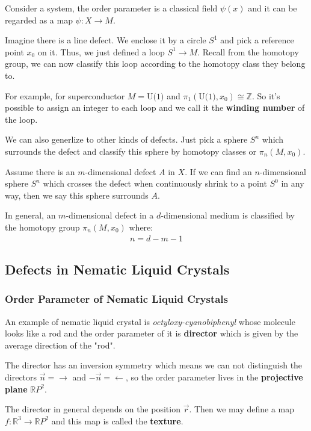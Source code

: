 \documentclass[10pt]{article}
\begin{document}
Consider a system, the order parameter is a classical field $\psi(x)$ and it can be regarded as a map $\psi:X\to M$.

Imagine there is a line defect.
We enclose it by a circle $S^1$ and pick a reference point $x_0$ on it.
Thus, we just defined a loop $S^1\to M$.
Recall from the homotopy group, we can now classify this loop according to the homotopy class they belong to.

For example, for superconductor $M=\text{U(1)}$ and $\pi_1\left(\text{U(1)},x_0\right)\cong\mathbb{Z}$.
So it's possible to assign an integer to each loop and we call it the \textbf{winding number} of the loop.

We can also generlize to other kinds of defects.
Just pick a sphere $S^n$ which surrounds the defect and classify this sphere by homotopy classes or $\pi_n(M,x_0)$.
\begin{remark}
    Assume there is an $m$-dimensional defect $A$ in $X$.
    If we can find an $n$-dimensional sphere $S^n$ which crosses the defect when continuously shrink to a point $S^0$ in any way, then we say this sphere surrounds $A$.
\end{remark}

In general, an $m$-dimensional defect in a $d$-dimensional medium is classified by the homotopy group $\pi_n(M,x_0)$ where:
\begin{align}
    n=d-m-1
\end{align}

\subsection{Defects in Nematic Liquid Crystals}
\subsubsection{Order Parameter of Nematic Liquid Crystals}
An example of nematic liquid crystal is \textit{octyloxy-cyanobiphenyl} whose molecule looks like a rod and the order parameter of it is \textbf{director} which is given by the average direction of the "rod".

The director has an inversion symmetry which means we can not distinguish the directors $\vec{n}=\rightarrow$ and $-\vec{n}=\leftarrow$, so the order parameter lives in the \textbf{projective plane} $\mathbb{R}P^2$.

The director in general depends on the position $\vec{r}$.
Then we may define a map $f:\mathbb{R}^3\to\mathbb{R}P^2$ and this map is called the \textbf{texture}.
\end{document}
